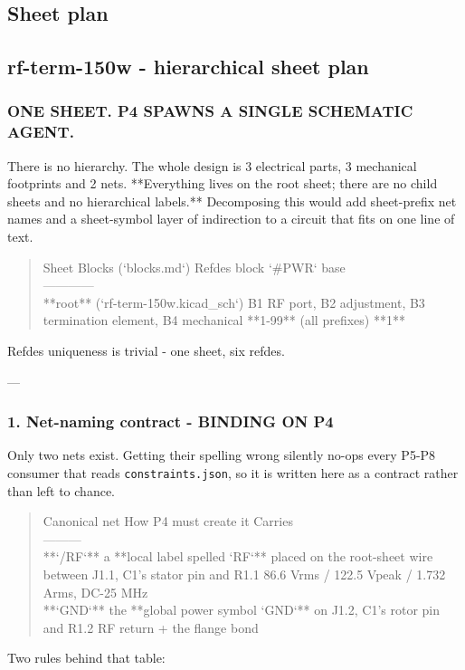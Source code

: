 \documentclass[11pt,a4paper]{article}
\begin{document}
\subsection*{Sheet plan}
\subsection*{rf-term-150w - hierarchical sheet plan}
\subsubsection*{ONE SHEET. P4 SPAWNS A SINGLE SCHEMATIC AGENT.}
There is no hierarchy. The whole design is 3 electrical parts, 3 mechanical footprints and 2 nets. {*}{*}Everything lives on the root sheet; there are no child sheets and no hierarchical labels.{*}{*} Decomposing this would add sheet-prefix net names and a sheet-symbol layer of indirection to a circuit that fits on one line of text.

\begin{quote}\small\ttfamily\raggedright
\textbar{} Sheet \textbar{} Blocks (`blocks.md`) \textbar{} Refdes block \textbar{} `\#PWR` base \textbar{}\\
\textbar{}---\textbar{}---\textbar{}---\textbar{}---\textbar{}\\
\textbar{} {*}{*}root{*}{*} (`rf-term-150w.kicad\_sch`) \textbar{} B1 RF port, B2 adjustment, B3 termination element, B4 mechanical \textbar{} {*}{*}1-99{*}{*} (all prefixes) \textbar{} {*}{*}1{*}{*} \textbar{}
\end{quote}
Refdes uniqueness is trivial - one sheet, six refdes.

---

\subsubsection*{1. Net-naming contract - BINDING ON P4}
Only two nets exist. Getting their spelling wrong silently no-ops every P5-P8 consumer that reads \texttt{constraints.json}, so it is written here as a contract rather than left to chance.

\begin{quote}\small\ttfamily\raggedright
\textbar{} Canonical net \textbar{} How P4 must create it \textbar{} Carries \textbar{}\\
\textbar{}---\textbar{}---\textbar{}---\textbar{}\\
\textbar{} {*}{*}`/RF`{*}{*} \textbar{} a {*}{*}local label spelled `RF`{*}{*} placed on the root-sheet wire between J1.1, C1's stator pin and R1.1 \textbar{} 86.6 Vrms / 122.5 Vpeak / 1.732 Arms, DC-25 MHz \textbar{}\\
\textbar{} {*}{*}`GND`{*}{*} \textbar{} the {*}{*}global power symbol `GND`{*}{*} on J1.2, C1's rotor pin and R1.2 \textbar{} RF return + the flange bond \textbar{}
\end{quote}
Two rules behind that table:
\end{document}
